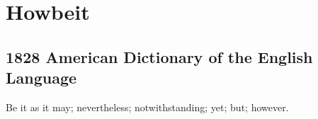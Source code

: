 \section{Howbeit}
	\label{HOWBEIT}
	

\subsection{1828 American Dictionary of the English Language} %
	\label{HOWBEIT-1828}

	\begin{compactitem}
		\item Be it as it may; nevertheless; notwithstanding; yet; but; however.
	\end{compactitem}


	



